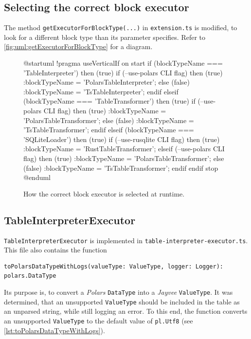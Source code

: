 \subsection{Selecting the correct block executor}
\label{subsection:createBlockExecutor}
The method \Verb|getExecutorForBlockType(...)| in \Verb|extension.ts| is modified, to look for a different block type than its parameter specifies.
Refer to \autoref{fig:uml:getExecutorForBlockType} for a diagram.
\begin{figure}
	\begin{plantuml}
		@startuml
		!pragma useVerticalIf on
		start
		if (blockTypeName === 'TableInterpreter') then (true)
		if (--use-polars CLI flag) then (true)
		:blockTypeName = 'PolarsTableInterpreter';
		else (false)
		:blockTypeName = 'TsTableInterpreter';
		endif
		elseif (blockTypeName === 'TableTransformer') then (true)
		if (--use-polars CLI flag) then (true)
		:blockTypeName = 'PolarsTableTransformer';
		else (false)
		:blockTypeName = 'TsTableTransformer';
		endif
		elseif (blockTypeName === 'SQLiteLoader') then (true)
		if (--use-rusqlite CLI flag) then (true)
		:blockTypeName = 'RustTableTransformer';
		elseif (--use-polars CLI flag) then (true)
		:blockTypeName = 'PolarsTableTransformer';
		else (false)
		:blockTypeName = 'TsTableTransformer';
		endif
		endif
		stop
		@enduml
	\end{plantuml}
	\caption{How the correct block executor is selected at runtime.}
	\label{fig:uml:getExecutorForBlockType}
\end{figure}


\subsection{TableInterpreterExecutor}
\label{section:tableinterpreterexecutor}

\Verb|TableInterpreterExecutor| is implemented in \Verb|table-interpreter-executor.ts|.
This file also contains the function
\begin{center}
	\begin{verbatim}
toPolarsDataTypeWithLogs(valueType: ValueType, logger: Logger): polars.DataType
	\end{verbatim}
\end{center}
Its purpose is, to convert a \emph{Polars} \Verb|DataType| into a \emph{Jayvee} \Verb|ValueType|.
It was determined, that an unsupported \Verb|ValueType| should be included in the table as an unparsed string, while still logging an error.
To this end, the function converts an unsupported \Verb|ValueType| to the default value of \Verb|pl.Utf8| (see \autoref{lst:toPolarsDataTypeWithLogs}).

